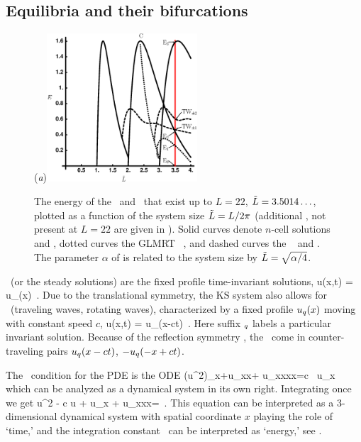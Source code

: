 \subsection{Equilibria and their bifurcations}

\begin{figure}[ht]
\begin{center}
  (\textit{a})\includegraphics[width=0.5\textwidth]{../figs/ksBifDiag.eps}
\end{center}
\caption[KS steady state bifurcations]{
The energy  of the \eqva\ and \reqva\ that
exist up to $L=22$, $\tilde{L} = 3.5014\ldots$, plotted as a function
of the system size $\tilde{L} = L/2\pi$ (additional \eqva, not present
at $L = 22$ are given in ). Solid curves denote
$n$-cell solutions  and , dotted curves the GLMRT
\eqv\ ,
and dashed curves the \reqva\  and .
The parameter $\alpha$ of  is
related to the system size by $\tilde{L}=\sqrt{\alpha/4}$.    }
\label{fig:ksBifDiag}
\end{figure}

\Eqva\  (or the steady solutions)
are the fixed profile time-invariant solutions,
\beq
 u(x,t) = u_\stagn(x)
\,.
Due to the translational symmetry,
the KS system also allows for
\reqva\ (traveling waves, rotating waves),
characterized by a fixed profile $u_\stagn(x)$
moving with constant speed $c$, {\ie}
\beq
 u(x,t) =  u_\stagn(x-ct)
\,.
Here suffix ${}_\stagn$ labels a particular invariant solution.
Because of the reflection symmetry ,
the \reqva\ come in counter-traveling pairs
$u_\stagn(x-ct)$, $-u_\stagn(-x+ct)$.

The \reqv\ condition for the {\KS} PDE 
is the ODE
\beq
{\textstyle{}}(u^2)_x+u_{xx}+ u_{xxxx}=c \, u_x
which can be analyzed as a dynamical system in its own right.
Integrating once we get
\beq
{\textstyle{}}u^2 - c u + u_x + u_{xxx}=\expctE
\,.
\label{eq:stdks}
\eeq
This equation can be interpreted as a 3-dimen\-si\-on\-al dynamical system
with spatial coordinate $x$ playing the role of `time,'
and the integration constant \expctE\ can be interpreted as `energy,'
see .

